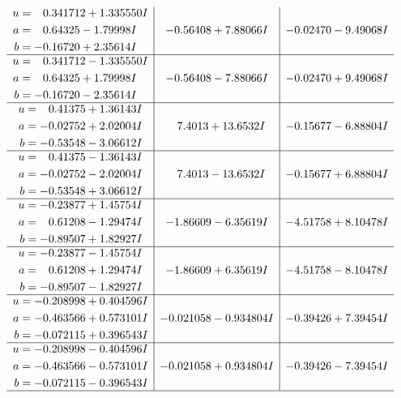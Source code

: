 \documentclass[1p]{elsarticle_modified}
\theoremstyle{definition}
\begin{document}
$$\begin{array}{c|c|c}
\begin{aligned}
u &= \phantom{-}0.341712 + 1.335550 I \\
a &= \phantom{-}0.64325 - 1.79998 I \\
b &= -0.16720 + 2.35614 I\end{aligned}
 & -0.56408 + 7.88066 I & -0.02470 - 9.49068 I \\ \hline\begin{aligned}
u &= \phantom{-}0.341712 - 1.335550 I \\
a &= \phantom{-}0.64325 + 1.79998 I \\
b &= -0.16720 - 2.35614 I\end{aligned}
 & -0.56408 - 7.88066 I & -0.02470 + 9.49068 I \\ \hline\begin{aligned}
u &= \phantom{-}0.41375 + 1.36143 I \\
a &= -0.02752 + 2.02004 I \\
b &= -0.53548 - 3.06612 I\end{aligned}
 & \phantom{-}7.4013 + 13.6532 I & -0.15677 - 6.88804 I \\ \hline\begin{aligned}
u &= \phantom{-}0.41375 - 1.36143 I \\
a &= -0.02752 - 2.02004 I \\
b &= -0.53548 + 3.06612 I\end{aligned}
 & \phantom{-}7.4013 - 13.6532 I & -0.15677 + 6.88804 I \\ \hline\begin{aligned}
u &= -0.23877 + 1.45754 I \\
a &= \phantom{-}0.61208 - 1.29474 I \\
b &= -0.89507 + 1.82927 I\end{aligned}
 & -1.86609 - 6.35619 I & -4.51758 + 8.10478 I \\ \hline\begin{aligned}
u &= -0.23877 - 1.45754 I \\
a &= \phantom{-}0.61208 + 1.29474 I \\
b &= -0.89507 - 1.82927 I\end{aligned}
 & -1.86609 + 6.35619 I & -4.51758 - 8.10478 I \\ \hline\begin{aligned}
u &= -0.208998 + 0.404596 I \\
a &= -0.463566 + 0.573101 I \\
b &= -0.072115 + 0.396543 I\end{aligned}
 & -0.021058 - 0.934804 I & -0.39426 + 7.39454 I \\ \hline\begin{aligned}
u &= -0.208998 - 0.404596 I \\
a &= -0.463566 - 0.573101 I \\
b &= -0.072115 - 0.396543 I\end{aligned}
 & -0.021058 + 0.934804 I & -0.39426 - 7.39454 I\\
 \hline 
 \end{array}$$\newpage\newpage\renewcommand{\arraystretch}{1}
\end{document}
